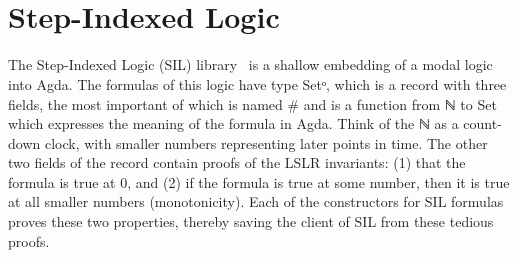 \begin{code}%
\>[0]\AgdaSpace{}%
\AgdaSymbol{:}\AgdaSpace{}%
\AgdaSymbol{(}\AgdaSpace{}%
\AgdaSpace{}%
\AgdaSymbol{:}\AgdaSpace{}%
\AgdaSymbol{)}\AgdaSpace{}%
\AgdaSpace{}%
\<%
\\
\>[0]\AgdaSpace{}%
\AgdaSpace{}%
\AgdaSpace{}%
\AgdaSymbol{=}\AgdaSpace{}%
\AgdaSymbol{(}\AgdaSpace{}%
\AgdaSpace{}%
\AgdaSpace{}%
\AgdaSpace{}%
\AgdaSymbol{)}\AgdaSpace{}%
\AgdaSpace{}%
\AgdaSymbol{(}\AgdaSpace{}%
\AgdaSpace{}%
\AgdaSpace{}%
\AgdaSpace{}%
\AgdaSymbol{)}\AgdaSpace{}%
\AgdaSpace{}%
\AgdaSymbol{(}\AgdaSpace{}%
\AgdaSpace{}%
\AgdaSpace{}%
\AgdaSpace{}%
\AgdaSpace{}%
\AgdaSpace{}%
\AgdaSpace{}%
\AgdaSpace{}%
\AgdaSymbol{)}\<%
\\
\>[0][@{}l@{\AgdaIndent{0}}]%
\>[4]\AgdaSpace{}%
\AgdaSymbol{(}\AgdaSpace{}%
\AgdaSpace{}%
\AgdaSpace{}%
\AgdaSpace{}%
\AgdaSymbol{)}\AgdaSpace{}%
\AgdaSpace{}%
\AgdaSymbol{(}\AgdaSpace{}%
\AgdaSpace{}%
\AgdaSpace{}%
\AgdaSpace{}%
\AgdaSpace{}%
\AgdaSpace{}%
\AgdaSymbol{)}\<%
\end{code}

\section{Step-Indexed Logic}
\label{sec:SIL}

The Step-Indexed Logic (SIL) library~\cite{Siek:2023aa} is a shallow
embedding of a modal logic into Agda. The formulas of this logic have
type \textsf{Setᵒ}, which is a record with three fields, the most
important of which is named \textsf{\#} and is a function from ℕ to
\textsf{Set} which expresses the meaning of the formula in Agda.
Think of the ℕ as a count-down clock, with smaller numbers
representing later points in time. The other two fields of the record
contain proofs of the LSLR invariants: (1) that the formula is true at
0, and (2) if the formula is true at some number, then it is true at
all smaller numbers (monotonicity). Each of the constructors for SIL
formulas proves these two properties, thereby saving the client of SIL
from these tedious proofs.

